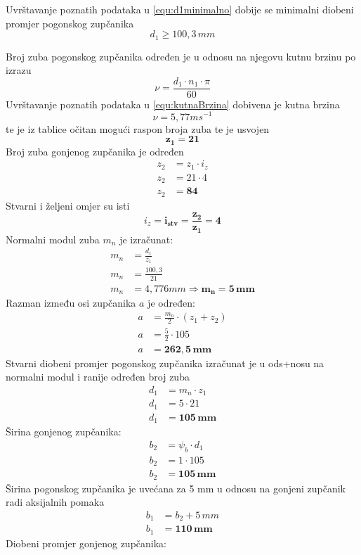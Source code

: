 \documentclass[11pt,a4paper,openright,twoside]{report}
\begin{document}
Uvrštavanje poznatih podataka u \eqref{equ:d1minimalno} dobije se minimalni diobeni promjer pogonskog zupčanika $$d_1\geq 100,3\,mm$$

Broj zuba pogonskog zupčanika određen je u odnosu na njegovu kutnu brzinu po izrazu
\begin{equation}
\nu=\frac{d_1 \cdot n_1 \cdot \pi}{60}\label{equ:kutnaBrzina}
\end{equation}
Uvrštavanje poznatih podataka u \eqref{equ:kutnaBrzina} dobivena je kutna brzina
$$\nu=5,77 ms^{-1}$$
te je iz tablice \cite{potrebniMaterijali} očitan mogući raspon broja zuba te je usvojen 
$$\mathbf{z_1=21}$$
Broj zuba gonjenog zupčanika je određen
\begin{align*}
z_2&=z_1 \cdot i_z\\
z_2&=21 \cdot 4\\
z_2&=\mathbf{84}
\end{align*}
Stvarni i željeni omjer su isti $$i_z=\mathbf{i_{stv}=\frac{z_2}{z_1}=4}$$
Normalni modul zuba $m_n$ je izračunat:
\begin{align*}
m_n&=\frac{d_1}{z_1}\\
m_n&=\frac{100,3}{21}\\
m_n&=4,776 mm \Rightarrow \mathbf{m_n=5\, mm}
\end{align*}
Razman između osi zupčanika $a$ je određen:
\begin{align*}
a&=\frac{m_n}{2} \cdot (z_1 + z_2)\\
a&=\frac{5}{2} \cdot 105\\
a&=\mathbf{262,5\,mm}
\end{align*}
Stvarni diobeni promjer pogonskog zupčanika izračunat je u ods+nosu na normalni modul i ranije određen broj zuba
\begin{align*}
d_1&=m_n \cdot z_1\\
d_1&=5 \cdot 21\\
d_1&=\mathbf{105 \, mm}
\end{align*}
Širina gonjenog zupčanika:
\begin{align*}
b_2&=\psi_b \cdot d_1\\
b_2&=1 \cdot 105\\
b_2&=\mathbf{105 \,mm}
\end{align*}
Širina pogonskog zupčanika je uvećana za 5 mm u odnosu na gonjeni zupčanik radi aksijalnih pomaka
\begin{align*}
b_1&=b_2+5\,mm\\
b_1&=\mathbf{110 \,mm}
\end{align*}
Diobeni promjer gonjenog zupčanika:
\end{document}
